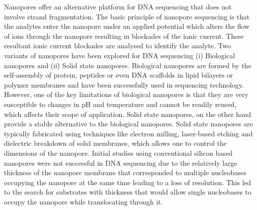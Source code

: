 Nanopores offer an alternative platform for DNA sequencing that does not involve strand fragmentation. The basic principle of nanopore sequencing is that the analytes enter the nanopore under an applied potential which alters the flow of ions through the nanopore resulting in blockades of the ionic current.  These resultant ionic current blockades are analysed to identify the analyte. Two variants of nanopores have been explored for DNA sequencing (i) Biological nanopores and (ii) Solid state nanopores. Biological nanopores are formed by the self-assembly of protein, peptides or even DNA scaffolds in lipid bilayers or polymer membranes and have been successfully used in sequencing technology.\supercite{hu_biological_2021} However, one of the key limitations of biological nanopores is that they are very susceptible to changes in pH and temperature and cannot be readily reused, which affects their scope of application.\supercite{haque_solid-state_2013} Solid state nanopores, on the other hand provide a stable alternative to the biological nanopores. Solid state nanopores are typically fabricated using techniques like electron milling,\supercite{storm_fabrication_2003} laser-based etching\supercite{gilboa_optically-monitored_2018} and dielectric breakdown of solid membranes,\supercite{waugh_solid-state_2020} which allows one to control the dimensions of the nanopore. Initial studies using conventional silicon based nanopores were not successful in DNA sequencing due to the relatively large thickness of the nanopore membrane that corresponded to multiple nucleobases occupying the nanopore at the same time leading to a loss of resolution.\supercite{li_dna_2003} This led to the search for substrates with thickness that would allow single nucleobases to occupy the nanopore while translocating through it. 

